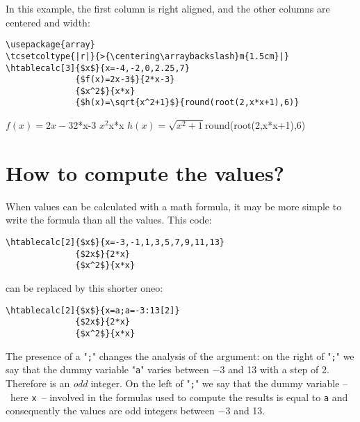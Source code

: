 \documentclass[a4paper,10pt]{article}
\newcommand\mywidth{0.85\linewidth}
\begin{document}
In this example, the first column is right aligned, and the other columns are centered and  width:
\begin{center}
\begin{minipage}{\mywidth}
\begin{lstlisting}
\usepackage{array}
\tcsetcoltype{|r|}{>{\centering\arraybackslash}m{1.5cm}|}
\htablecalc[3]{$x$}{x=-4,-2,0,2.25,7}
              {$f(x)=2x-3$}{2*x-3}
              {$x^2$}{x*x}
              {$h(x)=\sqrt{x^2+1}$}{round(root(2,x*x+1),6)}
\end{lstlisting}
\end{minipage}

              {$f(x)=2x-3$}{2*x-3}
              {$x^2$}{x*x}
              {$h(x)=\sqrt{x^2+1}$}{round(root(2,x*x+1),6)}
\end{center}

\section{How to compute the values?}
When values can be calculated with a math formula, it may be more simple to write the formula than all the values. This code:
\begin{center}
\begin{minipage}{\mywidth}
\begin{lstlisting}
\htablecalc[2]{$x$}{x=-3,-1,1,3,5,7,9,11,13}
              {$2x$}{2*x}
              {$x^2$}{x*x}
\end{lstlisting}
\end{minipage}
\end{center}
can be replaced by this shorter oneo:
\begin{center}
\begin{minipage}{\mywidth}
\begin{lstlisting}
\htablecalc[2]{$x$}{x=a;a=-3:13[2]}
              {$2x$}{2*x}
              {$x^2$}{x*x}
\end{lstlisting}
\end{minipage}
\end{center}
The presence of a "\verb=;=" changes the analysis of the argument: on the right of "\verb=;=" we say that the dummy variable "\verb=a=" varies between $-3$ and 13 with a step of 2. Therefore is an \emph{odd} integer. On the left of "\verb=;=" we say that the dummy variable --~here \verb=x=~-- involved in the formulas used to compute the results is equal to \verb=a= and consequently the values are odd integers between $-3$ and 13.
\end{document}
